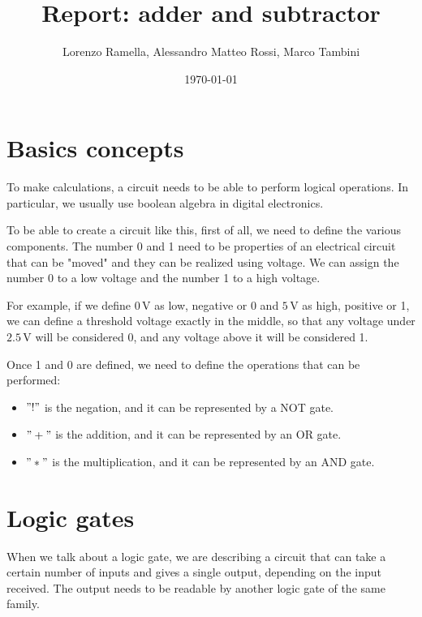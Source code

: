\documentclass{article}
\title{Report: adder and subtractor}
\author{Lorenzo Ramella, Alessandro Matteo Rossi, Marco Tambini}
\date{\today}
\begin{document}
\maketitle

\tableofcontents

\clearpage

\section{Basics concepts}

To make calculations, a circuit needs to be able to perform logical operations. In particular, we usually use boolean algebra in digital electronics. 

\vspace{3mm}

To be able to create a circuit like this, first of all, we need to define the various components.
The number 0 and 1 need to be properties of an electrical circuit that can be "moved" and they can be realized using voltage. We can assign the number 0 to a low voltage and the number 1 to a high voltage. 

\vspace{3mm}

For example, if we define $0\,\textrm{V}$ as low, negative or 0 and $5\,\textrm{V}$ as high, positive or 1, we can define a threshold voltage exactly in the middle, so that any voltage under $2.5\,\textrm{V}$ will be considered 0, and any voltage above it will be considered 1.

\vspace{3mm}

Once 1 and 0 are defined, we need to define the operations that can be performed:

\begin{itemize}
\item $"!"$ is the negation, and it can be represented by a NOT gate.
\item $"+"$ is the addition, and it can be represented by an OR gate.
\item $"*"$ is the multiplication, and it can be represented by an AND gate.
\end{itemize}


\clearpage


\section{Logic gates}

When we talk about a logic gate, we are describing a circuit that can take a certain number of inputs and gives a single output, depending on the input received. The output needs to be readable by another logic gate of the same family.
\end{document}
